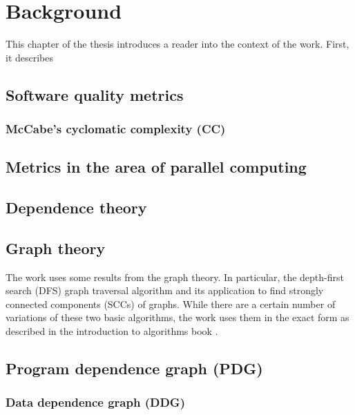 \chapter{Background} \label{backgroud}

\qquad This chapter of the thesis introduces a reader into the context of the work. First, it describes  

\section{Software quality metrics} \label{background-software-quality-metrics}

\subsection{McCabe's cyclomatic complexity (CC)}
\cite{cyclomatic-complexity}

\section{Metrics in the area of parallel computing}

\section{Dependence theory} \label{background-dependence-theory}
\cite{optimizing-compilers-book}

\section{Graph theory} \label{background-graph-theory}
\qquad The work uses some results from the graph theory. In particular, the depth-first search (DFS) graph traversal algorithm and its application to find strongly connected components (SCCs) of graphs. While there are a certain number of variations of these two basic algorithms, the work uses them in the exact form as described in the introduction to algorithms book \cite{introduction-to-algorithms-book}.

\section{Program dependence graph (PDG)} \label{background-program-dependence-graph}

\cite{pdg}

\subsection{Data dependence graph (DDG)} \label{background-ddg}
